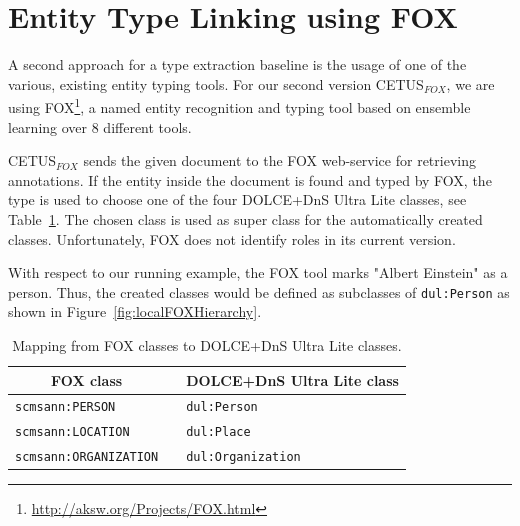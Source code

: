 \section{Entity Type Linking using FOX}
\label{sec:typeLinking}

A second approach for a type extraction baseline is the usage of one of the various, existing entity typing tools.
For our second version CETUS$_{FOX}$, we are using FOX\footnote{\url{http://aksw.org/Projects/FOX.html}}, a named entity recognition and typing tool based on ensemble learning over 8 different tools.

CETUS$_{FOX}$ sends the given document to the FOX web-service for retrieving annotations.
If the entity inside the document is found and typed by FOX, the type is used to choose one of the four DOLCE+DnS Ultra Lite classes, see Table~\ref{tab:foxclassmatching}.
The chosen class is used as super class for the automatically created classes.
Unfortunately, FOX does not identify roles in its current version.

With respect to our running example, the FOX tool marks "Albert Einstein" as a person.
Thus, the created classes would be defined as subclasses of \texttt{dul:Person} as shown in Figure~\ref{fig:localFOXHierarchy}.

\begin{table}
\centering
\begin{tabular}{lp{5mm}l}
\toprule
 \multicolumn{1}{c}{FOX class} && DOLCE+DnS Ultra Lite class \\
\midrule
 \texttt{scmsann:PERSON} && \texttt{dul:Person} \\
 \texttt{scmsann:LOCATION} && \texttt{dul:Place} \\
 \texttt{scmsann:ORGANIZATION} && \texttt{dul:Organization} \\
\bottomrule
\end{tabular}
\caption{Mapping from FOX classes to DOLCE+DnS Ultra Lite classes.}
\label{tab:foxclassmatching}
\end{table}



